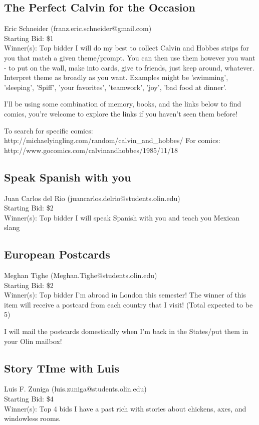 \documentclass[11pt]{article}
\begin{document}
\subsection{The Perfect Calvin for the Occasion}
Eric Schneider (franz.eric.schneider@gmail.com) \\
Starting Bid: \$1 \\
Winner(s): 
Top bidder\newline
I will do my best to collect Calvin and Hobbes strips for you that match a given theme/prompt. You can then use them however you want - to put on the wall, make into cards, give to friends, just keep around, whatever. Interpret theme as broadly as you want. Examples might be 'swimming', 'sleeping', 'Spiff', 'your favorites', 'teamwork', 'joy', 'bad food at dinner'.

I'll be using some combination of memory, books, and the links below to find comics, you're welcome to explore the links if you haven't seen them before!

To search for specific comics: http://michaelyingling.com/random/calvin\_and\_hobbes/
For comics: http://www.gocomics.com/calvinandhobbes/1985/11/18
\subsection{Speak Spanish with you}
Juan Carlos del Rio (juancarlos.delrio@students.olin.edu) \\
Starting Bid: \$2 \\
Winner(s): 
Top bidder\newline
I will speak Spanish with you and teach you Mexican slang
\subsection{European Postcards}
Meghan Tighe (Meghan.Tighe@students.olin.edu) \\
Starting Bid: \$2 \\
Winner(s): 
Top bidder\newline
I'm abroad in London this semester! The winner of this item will receive a postcard from each country that I visit! (Total expected to be 5)

I will mail the postcards domestically when I'm back in the States/put them in your Olin mailbox!
\subsection{Story TIme with Luis}
Luis F. Zuniga (luis.zuniga@students.olin.edu) \\
Starting Bid: \$4 \\
Winner(s): 
Top 4 bids\newline
I have a past rich with stories about chickens, axes, and windowless rooms.
\end{document}
